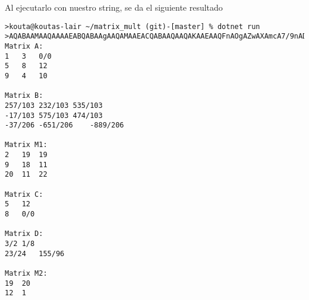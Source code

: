 \documentclass[11pt]{article}
\begin{document}
Al ejecutarlo con nuestro string, se da el siguiente resultado
\begin{lstlisting}
>kouta@koutas-lair ~/matrix_mult (git)-[master] % dotnet run
>AQABAAMAAQAAAAEABQABAAgAAQAMAAEACQABAAQAAQAKAAEAAQFnAOgAZwAXAmcA7/9nAD8CZwDaAWcA2//OAHX9zgCH/M4ABQABAAwAAQAIAAEAAAABAAMAAgABAAgAFwAYAJsAYAA=
Matrix A:
1	3	0/0	
5	8	12	
9	4	10	

Matrix B:
257/103	232/103	535/103	
-17/103	575/103	474/103	
-37/206	-651/206	-889/206	

Matrix M1:
2	19	19	
9	18	11	
20	11	22	

Matrix C:
5	12	
8	0/0	

Matrix D:
3/2	1/8	
23/24	155/96	

Matrix M2:
19	20	
12	1	
\end{lstlisting}
\end{document}
